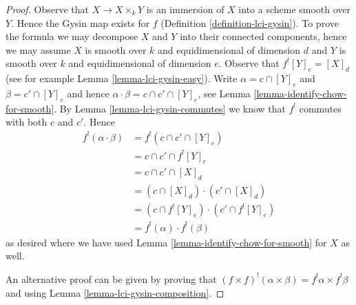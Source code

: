 \documentclass[10pt,a4paper]{amsart}
\theoremstyle{plain}
\theoremstyle{definition}
\theoremstyle{remark}
\numberwithin{equation}{subsection}
\begin{document}
\begin{proof}
Observe that $X \to X \times_k Y$ is an immersion of $X$ into a scheme
smooth over $Y$. Hence the Gysin map exists for $f$
(Definition \ref{definition-lci-gysin}).
To prove the formula we may decompose $X$ and $Y$ into their
connected components, hence we may assume $X$ is smooth over $k$
and equidimensional of dimension $d$ and $Y$ is smooth over $k$
and equidimensional of dimension $e$. Observe that
$f^![Y]_e = [X]_d$ (see for example Lemma \ref{lemma-lci-gysin-easy}).
Write $\alpha = c \cap [Y]_e$ and $\beta = c' \cap [Y]_e$
and hence $\alpha \cdot \beta = c \cap c' \cap [Y]_e$,
see Lemma \ref{lemma-identify-chow-for-smooth}.
By Lemma \ref{lemma-lci-gysin-commutes} we know that $f^!$
commutes with both $c$ and $c'$. Hence
\begin{align*}
f^!(\alpha \cdot \beta)
& =
f^!(c \cap c' \cap [Y]_e) \\
& =
c \cap c' \cap f^![Y]_e \\
& =
c \cap c' \cap [X]_d \\
& =
(c \cap [X]_d) \cdot (c' \cap [X]_d) \\
& =
(c \cap f^![Y]_e) \cdot (c' \cap f^![Y]_e) \\
& =
f^!(\alpha) \cdot f^!(\beta)
\end{align*}
as desired where we have used Lemma \ref{lemma-identify-chow-for-smooth}
for $X$ as well.

\medskip\noindent
An alternative proof can be given by proving that
$(f \times f)^!(\alpha \times \beta) = f^!\alpha \times f^!\beta$
and using Lemma \ref{lemma-lci-gysin-composition}.
\end{proof}
\end{document}
